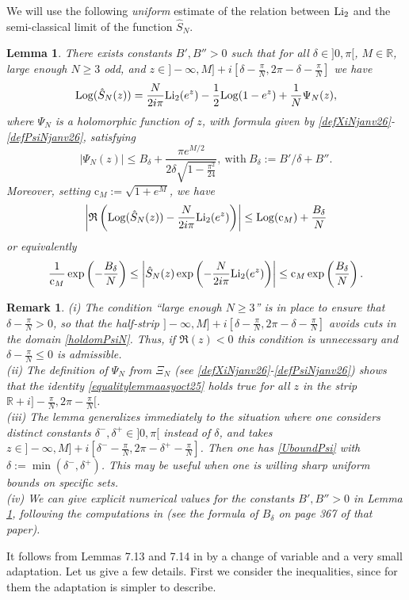 \documentclass[11pt]{amsart}
\newtheorem{lem}[teo]{Lemma}
\newtheorem{remark}[teo]{Remark}
\newcommand{\mr}{\mathbb{R}}
\newcommand{\R}{\mathbb{R}}
\newcommand{\Log}{{\rm Log}}
\begin{document}
{We will use the following {\it uniform} estimate of the relation between ${\rm Li}_2$ and the semi-classical limit of the function $\hat S_N$.
\begin{lem}\label{estimatehatS} There exists constants $B',B''>0$ such that for all  $\delta\in ]0,\pi[$, $M \in \R$,  large enough $N\geq 3$ odd, and $z\in ]-\infty,M] +i[\textstyle \delta-\frac{\pi}{N}, 2\pi-\delta-\frac{\pi}{N}]$ we have
\begin{equation}\label{equalitylemmaasyoct25}\Log(\hat{S}_N(z)) = \frac{N}{2i\pi}{\rm Li_2}(e^{z}) -\frac{1}{2} \Log(1-e^{z}) + \frac{1}{N}\Psi_N(z),
\end{equation}
where $\Psi_N$ is a holomorphic function of $z$, with formula given by \eqref{defXiNjanv26}-\eqref{defPsiNjanv26}, satisfying
\begin{equation}\label{UboundPsi}
\vert \Psi_N(z)\vert \leq B_\delta+\dfrac{\pi e^{M/2}}{2\delta\sqrt{1- \frac{\pi^2}{24}}},\ \mathrm{with}\ B_\delta := B'/\delta+B''.
\end{equation}  
Moreover, setting $\mathrm{c}_M:=\sqrt{1+e^M}$, we have
 $$\left\vert \mathfrak{R}\left(\Log(\hat{S}_N(z)) -\frac{N}{2i\pi}{\rm Li_2}(e^{z})\right) \right\vert \leq \Log(\mathrm{c}_M) + \frac{B_\delta}{N}$$
 or equivalently
$$ \dfrac{1}{\mathrm{c}_M}\exp\left(-\frac{B_\delta}{N}\right) \leq
\left\vert \hat{S}_N(z)\exp\left( -\frac{N}{2i\pi}{\rm Li_2}(e^z)\right) \right\vert \leq \mathrm{c}_M\exp\left(\frac{B_\delta}{N}\right).$$
\end{lem}
\begin{remark}\label{rem:largeN} {\rm (i) The condition ``large enough $N\geq 3$'' is in place to ensure that $\textstyle \delta-\frac{\pi}{N}>0$, so that the half-strip $\textstyle ]-\infty,M] +i[\textstyle \delta-\frac{\pi}{N}, 2\pi-\delta-\frac{\pi}{N}]$ avoids cuts in the domain \eqref{holdomPsiN}. Thus, if $\mathfrak{R}(z)<0$ this condition is unnecessary and $\textstyle \delta-\frac{\pi}{N}\leq 0$ is admissible.\\
(ii) The definition of $\Psi_N$ from $\Xi_N$ (see \eqref{defXiNjanv26}-\eqref{defPsiNjanv26}) shows that the identity \eqref{equalitylemmaasyoct25} holds true for all $z$ in the strip $\mr +i]\textstyle -\frac{\pi}{N}, 2\pi-\frac{\pi}{N}[$.\\
(iii) The lemma generalizes immediately to the situation where one considers distinct constants $\delta^-, \delta^+\in ]0,\pi[$  instead of $\delta$, and takes $z\in ]-\infty,M] +i[\textstyle \delta^--\frac{\pi}{N}, 2\pi-\delta^+-\frac{\pi}{N}]$. Then one has \eqref{UboundPsi} with $\delta:= \min(\delta^-,\delta^+)$. This may be useful when one is willing sharp uniform bounds on specific sets.\\ 
(iv)  We can give explicit numerical values for the constants $B',B''>0$ in Lemma \ref{estimatehatS}, following the computations in \cite[Lemma 7.13]{BGP-N} (see the formula of $B_\delta$ on page 367 of that paper).
}\end{remark}
\proof It follows from Lemmas 7.13 and 7.14 in \cite{BGP-N} by a change of variable and a very small adaptation. Let us give a few details. First we consider the inequalities, since for them the adaptation is simpler to describe.

}
\end{document}
